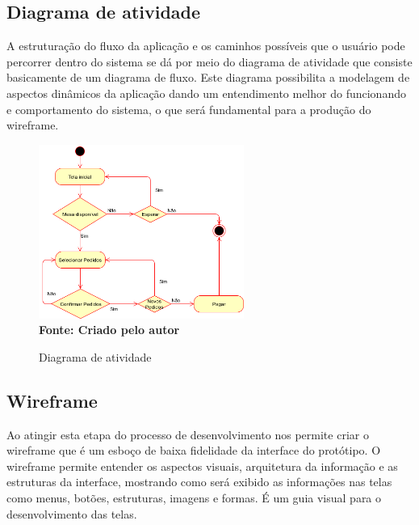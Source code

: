 \subsection{\esp Diagrama de atividade}

A estruturação do fluxo da aplicação e os caminhos possíveis que o usuário pode percorrer dentro do sistema se dá por meio do diagrama de atividade que consiste basicamente de um diagrama de fluxo. Este diagrama possibilita a modelagem de aspectos dinâmicos da aplicação dando um entendimento melhor do funcionando e comportamento do sistema, o que será fundamental para a produção do wireframe.

\begin{figure}[ht]
	\centering	
	\caption[\hspace{0.1cm}]{Diagrama de atividade}
	\vspace{-0.4cm}
	\includegraphics[width=0.6\textwidth]{figuras/diagrama-de-atividade.png}
	 \vspace{-0.2cm}
	\\\textbf{\footnotesize Fonte: Criado pelo autor }
	\label{fig:casodeuso}
\end{figure}
\vspace{-0.5cm}

\subsection{\esp Wireframe}

Ao atingir esta etapa do processo de desenvolvimento nos permite criar o wireframe que é um esboço de baixa fidelidade da interface do protótipo. O wireframe permite entender os aspectos visuais, arquitetura da informação e as estruturas da interface, mostrando como será exibido as informações nas telas como menus, botões, estruturas, imagens e formas. É um guia visual para o desenvolvimento das telas.

